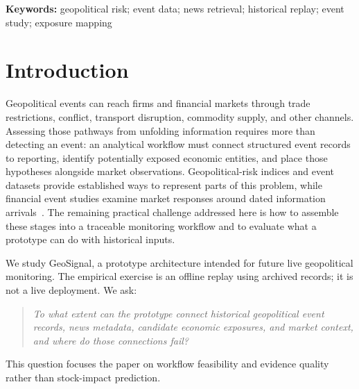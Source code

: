 \documentclass[10pt,a4paper,twocolumn]{article}
\begin{document}
\noindent\textbf{Keywords:} geopolitical risk; event data; news retrieval; historical replay; event study; exposure mapping

\section{Introduction}\label{sec:intro}

Geopolitical events can reach firms and financial markets through trade restrictions, conflict, transport disruption, commodity supply, and other channels. Assessing those pathways from unfolding information requires more than detecting an event: an analytical workflow must connect structured event records to reporting, identify potentially exposed economic entities, and place those hypotheses alongside market observations. Geopolitical-risk indices and event datasets provide established ways to represent parts of this problem, while financial event studies examine market responses around dated information arrivals~\cite{CaldaraIacoviello2022,MacKinlay1997}. The remaining practical challenge addressed here is how to assemble these stages into a traceable monitoring workflow and to evaluate what a prototype can do with historical inputs.

We study GeoSignal, a prototype architecture intended for future live geopolitical monitoring. The empirical exercise is an offline replay using archived records; it is not a live deployment. We ask:

\begin{quote}
\emph{To what extent can the prototype connect historical geopolitical event records, news metadata, candidate economic exposures, and market context, and where do those connections fail?}
\end{quote}

This question focuses the paper on workflow feasibility and evidence quality rather than stock-impact prediction.
\end{document}
